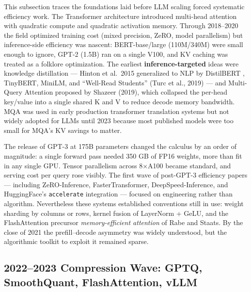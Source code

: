 \documentclass{article}
\begin{document}
This subsection traces the foundations laid before LLM scaling forced systematic efficiency work. The Transformer architecture \citep{vaswani2017attentionisallyoun} introduced multi-head attention with quadratic compute and quadratic activation memory. Through 2018--2020 the field optimized training cost (mixed precision, ZeRO, model parallelism) but inference-side efficiency was nascent: BERT-base/large (110M/340M) were small enough to ignore, GPT-2 (1.5B) ran on a single V100, and KV caching was treated as a folklore optimization. The earliest \textbf{inference-targeted} ideas were knowledge distillation --- Hinton et al.~2015 generalized to NLP by DistilBERT \citep{sanh2019distilbertadistill}, TinyBERT, MiniLM, and ``Well-Read Students'' (Turc et al., 2019) --- and Multi-Query Attention proposed by Shazeer (2019), which collapsed the per-head key/value into a single shared K and V to reduce decode memory bandwidth. MQA was used in early production transformer translation systems but not widely adopted for LLMs until 2023 because most published models were too small for MQA's KV savings to matter.

The release of GPT-3 \citep{brown20202020} at 175B parameters changed the calculus by an order of magnitude: a single forward pass needed 350 GB of FP16 weights, more than fit in any single GPU. Tensor parallelism across 8×A100 became standard, and serving cost per query rose visibly. The first wave of post-GPT-3 efficiency papers --- including ZeRO-Inference, FasterTransformer, DeepSpeed-Inference, and HuggingFace's \texttt{accelerate} integration --- focused on engineering rather than algorithm. Nevertheless these systems established conventions still in use: weight sharding by columns or rows, kernel fusion of LayerNorm + GeLU, and the FlashAttention precursor \emph{memory-efficient attention} of Rabe and Staats. By the close of 2021 the prefill--decode asymmetry was widely understood, but the algorithmic toolkit to exploit it remained sparse.

\subsection{2022--2023 Compression Wave: GPTQ, SmoothQuant, FlashAttention, vLLM}\label{compression-wave-gptq-smoothquant-flashattention-vllm}
\end{document}
